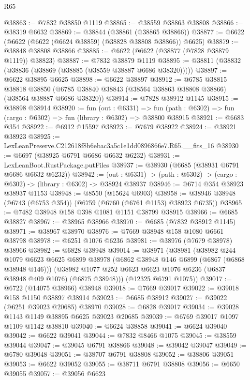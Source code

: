 \begin{lexlean}{R65}
\begin{coremodule}
{@38863 := @7832 @38850 @1119
@38865 := @38559 @38863 @38808
@38866 := @38319 @6632
@38869 := @38844 (@38861 (@38865 @38866))
@38877 := @6622 (@6622 (@6622 (@6624 @38859) (@38828 @38808 @38866)) @6625)
@38879 := @38848 @38808 @38866
@38885 := @6622 (@6622 (@38877 (@7828 @38879 @1119)) @38823)
@38887 := @7832 @38879 @1119
@38895 := @38811 (@38832 (@38836 (@38869 (@38885 (@38559 @38887 @6686 @38320)))))
@38897 := @6622 @38895 @6625
@38898 := @6622 @38897
@38912 := @6785
    @38815
    @38818
    @38850
    (@6785 @38840 @38843 (@38564 @38863 @38808 @38866) (@38564 @38887 @6686 @38320))
@38914 := @7828 @38912 @1145
@38915 := @38898 @38914
@38920 := fun (out : @6331) =>
  fun (path : @6302) => fun (cargo : @6302) => fun (library : @6302) => @38800 @38915
@38921 := @6683 @354
@38922 := @6912 @15597
@38923 := @7679 @38922
@38924 := @38921 @38923
@38925 := LexLeanPreserve.C212618f8b6ebac3a5c1e1dd0896866e7.R65.__fits_16
@38930 := @6697 (@38925 @6791 @6686 @6632 @6232)
@38931 := LexLeanBoot.RustPackage.putFiles
@38937 := @38930 (@6685 (@38931 @6791 @6686 @6632 @6232))
@38942 := (out : @6331) -> (path : @6302) -> (cargo : @6302) -> (library : @6302) -> @38924 @38937
@38946 := @6714 @354 @38923 @38937 @1153
@38948 := @8550 (@15624 @6903)
@38958 := @38946 @38948 (@6743 (@6753 @354)) (@6759 (@6760 (@6761 @1153) @38923 @6735))
@38965 := @7482 @38948 @158 @398 @1081 @1151 @38799 @38915
@38966 := @6685 @38827
@38967 := @38965 @38966
@38970 := @6685 (@7832 @38912 @1145)
@38971 := @38967 @38970
@38976 := @7669 @38948 @158 @1080 @6661 @38798
@38978 := @6251 @1076 @6236
@38981 := @38976 (@7679 @38978) @38966
@38982 := @6828 @38948
@39014 := @38971
    (@38981
      (@38982
        @244
        @1079
        @6623
        @6625
        @6899
        @38978
        (@6862 @38948 @146 @6899 (@6867 (@6868 @38948 @146)))
        (@38982 @1077 @252 @6623 @6623 @1076 @6236 (@6837 @38948 @409 @1076) (@6875 @38948)))
      (@12325 @6791 @1075))
@39017 := @6722 (@14075 @38966) @38948
@39018 := @7669 @39017
@39022 := @39018 @158 @1150 @38897 @38914
@39023 := @6685 @38912
@39027 := @39022 (@6251 @39023 @20685) @38970
@39028 := @6828 @39017
@39034 := @39028 @1143 @1149 @38895 @6625 @39023 @20685
@39039 := @6769 @39017 @1097 @1109 @1142 @38810
@39040 := @6624 @38858
@39041 := @6624 @39040
@39042 := @6622 @39041
@39044 := @7832 @8466 @1075
@39045 := @38559 @39044
@39047 := @39045 @6791 @38866
@39048 := @39042 @39047
@39049 := @6780 @39048
@39051 := @38707 @6791 @38808
@39052 := @38806 @39051
@39053 := @6622 @39052
@39055 := @38711 @6791 @38808
@39056 := @6650 @39055
@39057 := @39056 @6623
}
\end{coremodule}
\end{lexlean}
